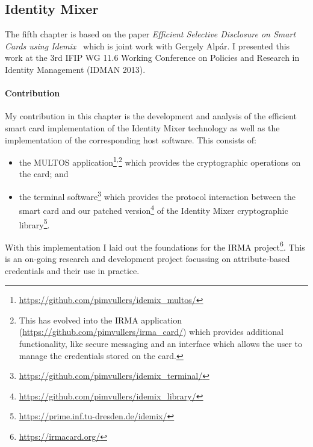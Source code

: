 \subsection{Identity Mixer}

The fifth chapter is based on the paper \emph{Efficient Selective Disclosure on
Smart Cards using Idemix}~\cite{VullersAlpar2013} which is joint work with
Gergely Alp\'ar. I presented this work at the 3rd IFIP WG 11.6 Working
Conference on Policies and Research in Identity Management (IDMAN 2013).

\paragraph{Contribution}

My contribution in this chapter is the development and analysis of the efficient
smart card implementation of the Identity Mixer technology as well as the
implementation of the corresponding host software. This consists of:
\begin{itemize}
  \item the MULTOS application\footnote{\url{https://github.com/pimvullers/idemix_multos/}
    }\textsuperscript{,}\footnote{This has evolved into the IRMA application
    (\url{https://github.com/pimvullers/irma_card/}) which provides additional
    functionality, like secure messaging and an interface which allows the user
    to manage the credentials stored on the card.}
    which provides the cryptographic operations on the card; and
  \item the terminal software\footnote{\url{https://github.com/pimvullers/idemix_terminal/}}
    which provides the protocol interaction between the smart card and our
    patched version\footnote{\url{https://github.com/pimvullers/idemix_library/}}
    of the Identity Mixer cryptographic library\footnote{\url{https://prime.inf.tu-dresden.de/idemix/}}.
\end{itemize}

With this implementation I laid out the foundations %
for the IRMA project\footnote{\url{https://irmacard.org/}}. This is an on-going
research and development project focussing on attribute-based credentials and
their use in practice.